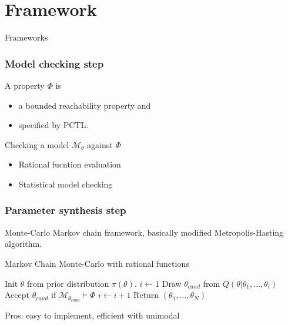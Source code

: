 \documentclass{beamer}
\begin{document}
\section{Framework}
\begin{frame}
    \begin{center}
        \Huge Frameworks
    \end{center}
\end{frame}

\begin{frame}
    \frametitle{Model checking step}
    A property $\Phi$ is
    \begin{itemize}
        \item a bounded reachability property and
        \item specified by PCTL.
    \end{itemize}
    Checking a model $\mathcal{M}_\theta$ against $\Phi$
    \begin{itemize}
        \item Rational fucntion evaluation
        \item Statistical model checking
    \end{itemize}
\end{frame}

\begin{frame}
    \frametitle{Parameter synthesis step}
    Monte-Carlo Markov chain framework, basically modified Metropolis-Hasting algorithm.
    \begin{algorithm}[H]
        \caption{Markov Chain Monte-Carlo with rational functions}
        \label{rf-mcmc-alg}
        \begin{algorithmic}[1]
            \State Init $\theta$ from prior distribution $\pi(\theta)$.
            \State $i \leftarrow 1$
            \State Draw $\theta_{cand}$ from $Q(\theta|\theta_1,\ldots,\theta_i)$
            \State Accept $\theta_{cand}$ if $\mathcal{M}_{\theta_{cand}} \models \Phi$
            \State $i \leftarrow i + 1$
            \EndIf
            \EndWhile
            \State Return $(\theta_1,\ldots,\theta_N)$
            \EndProcedure
        \end{algorithmic}
    \end{algorithm}
    Pros: easy to implement, efficient with unimodal
\end{frame}

\begin{frame}

\end{frame}
\end{document}
